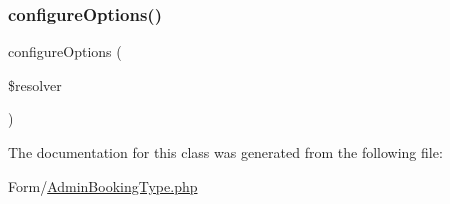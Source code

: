\mbox{\label{class_app_1_1_form_1_1_admin_booking_type_a8ff68a86f5090b5df973286836e46ead}} 
\subsubsection{\texorpdfstring{configureOptions()}{configureOptions()}}
{\footnotesize\ttfamily configure\+Options (\begin{DoxyParamCaption}\item[{Options\+Resolver}]{\$resolver }\end{DoxyParamCaption})}



The documentation for this class was generated from the following file\+:\begin{DoxyCompactItemize}
\item 
Form/\mbox{\hyperlink{_admin_booking_type_8php}{Admin\+Booking\+Type.\+php}}\end{DoxyCompactItemize}

